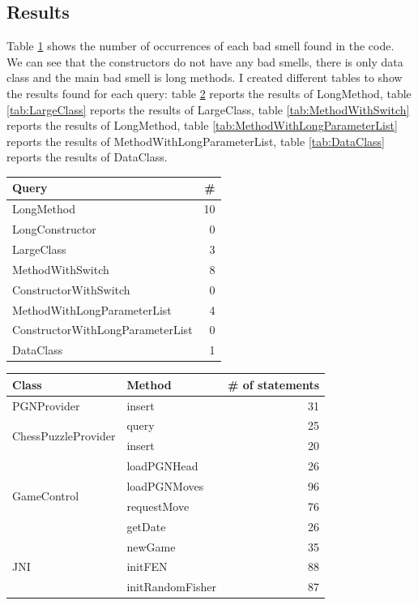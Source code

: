 \documentclass [14 pt]{article}
\begin{document}
\subsection{Results}
Table \ref{tab:BadSmellResults} shows the number of occurrences of each bad smell found in the code.\\
We can see that the constructors do not have any bad smells, there is only data class and the main bad smell is long methods.
I created different tables to show the results found for each query:
table \ref{tab:LongMethod} reports the results of LongMethod,
table \ref{tab:LargeClass} reports the results of LargeClass,
table \ref{tab:MethodWithSwitch} reports the results of LongMethod,
table \ref{tab:MethodWithLongParameterList} reports the results of MethodWithLongParameterList,
table \ref{tab:DataClass} reports the results of DataClass.
\begin{table}[h]
\centering
\begin{tabular}{|l  r|}
\hline	\textbf{Query}				&  \textbf{\#}	\\ \hline\hline
LongMethod							&	10	\\ 
LongConstructor						&	0	\\ 
LargeClass							&	3	\\ 
MethodWithSwitch					&	8	\\ 
ConstructorWithSwitch				&	0	\\ 
MethodWithLongParameterList			&	4	\\ 
ConstructorWithLongParameterList	&	0	\\ 
DataClass							&	1	\\ \hline
\end{tabular}
\label{tab:BadSmellResults}
\end{table}


\begin{table}[h]
\centering
\begin{tabular}{|l  l r|}
\hline
\textbf{Class}		&  \textbf{Method}	&  \textbf{\# of statements}	\\ \hline\hline
PGNProvider 			&	insert				&	31	\\ \hline
\multirow{2}{*}{ChessPuzzleProvider}
	&	query				&	25	\\
	&	insert				&	20	\\ \hline
\multirow{4}{*}{GameControl}
	&	loadPGNHead			&	26	\\
	&	loadPGNMoves		&	96	\\
	&	requestMove			&	76	\\
	&	getDate				&	26	\\ \hline
\multirow{3}{*}{JNI}
	&	newGame				&	35	\\
	&	initFEN				&	88	\\
	&	initRandomFisher	&	87	\\ \hline
\end{tabular}
\label{tab:LongMethod}
\end{table}
\end{document}
